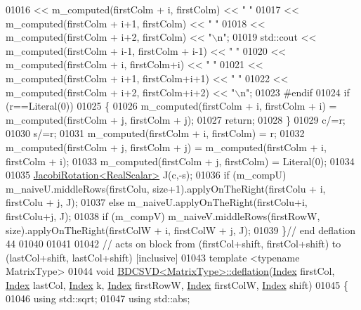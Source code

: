 \begin{DoxyCode}
01016     << m\_computed(firstColm + i, firstColm)  << \textcolor{stringliteral}{" "}
01017     << m\_computed(firstColm + i+1, firstColm) << \textcolor{stringliteral}{" "}
01018     << m\_computed(firstColm + i+2, firstColm) << \textcolor{stringliteral}{"\(\backslash\)n"};
01019   std::cout << m\_computed(firstColm + i-1, firstColm + i-1)  << \textcolor{stringliteral}{" "}
01020     << m\_computed(firstColm + i, firstColm+i)  << \textcolor{stringliteral}{" "}
01021     << m\_computed(firstColm + i+1, firstColm+i+1) << \textcolor{stringliteral}{" "}
01022     << m\_computed(firstColm + i+2, firstColm+i+2) << \textcolor{stringliteral}{"\(\backslash\)n"};
01023 \textcolor{preprocessor}{#endif}
01024   \textcolor{keywordflow}{if} (r==Literal(0))
01025   \{
01026     m\_computed(firstColm + i, firstColm + i) = m\_computed(firstColm + j, firstColm + j);
01027     \textcolor{keywordflow}{return};
01028   \}
01029   c/=r;
01030   s/=r;
01031   m\_computed(firstColm + i, firstColm) = r;  
01032   m\_computed(firstColm + j, firstColm + j) = m\_computed(firstColm + i, firstColm + i);
01033   m\_computed(firstColm + j, firstColm) = Literal(0);
01034 
01035   \hyperlink{group___jacobi___module_class_eigen_1_1_jacobi_rotation}{JacobiRotation<RealScalar>} J(c,-s);
01036   \textcolor{keywordflow}{if} (m\_compU)  m\_naiveU.middleRows(firstColu, size+1).applyOnTheRight(firstColu + i, firstColu + j, J);
01037   \textcolor{keywordflow}{else}          m\_naiveU.applyOnTheRight(firstColu+i, firstColu+j, J);
01038   \textcolor{keywordflow}{if} (m\_compV)  m\_naiveV.middleRows(firstRowW, size).applyOnTheRight(firstColW + i, firstColW + j, J);
01039 \}\textcolor{comment}{// end deflation 44}
01040 
01041 
01042 \textcolor{comment}{// acts on block from (firstCol+shift, firstCol+shift) to (lastCol+shift, lastCol+shift) [inclusive]}
01043 \textcolor{keyword}{template} <\textcolor{keyword}{typename} MatrixType>
01044 \textcolor{keywordtype}{void} \hyperlink{group___s_v_d___module_class_eigen_1_1_b_d_c_s_v_d}{BDCSVD<MatrixType>::deflation}(\hyperlink{namespace_eigen_a62e77e0933482dafde8fe197d9a2cfde}{Index} firstCol, 
      \hyperlink{namespace_eigen_a62e77e0933482dafde8fe197d9a2cfde}{Index} lastCol, \hyperlink{namespace_eigen_a62e77e0933482dafde8fe197d9a2cfde}{Index} k, \hyperlink{namespace_eigen_a62e77e0933482dafde8fe197d9a2cfde}{Index} firstRowW, \hyperlink{namespace_eigen_a62e77e0933482dafde8fe197d9a2cfde}{Index} firstColW, 
      \hyperlink{namespace_eigen_a62e77e0933482dafde8fe197d9a2cfde}{Index} shift)
01045 \{
01046   \textcolor{keyword}{using} std::sqrt;
01047   \textcolor{keyword}{using} std::abs;

\end{DoxyCode}
